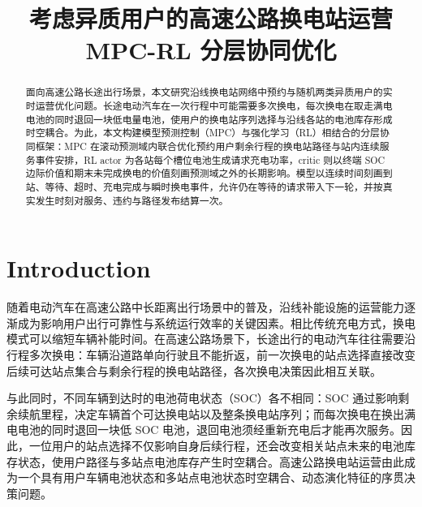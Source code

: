 \documentclass[12pt,a4paper,UTF8]{ctexart}
\begin{document}
\cover

\newpage
\begin{abstract}

面向高速公路长途出行场景，本文研究沿线换电站网络中预约与随机两类异质用户的实时运营优化问题。长途电动汽车在一次行程中可能需要多次换电，每次换电在取走满电电池的同时退回一块低电量电池，使用户的换电站序列选择与沿线各站的电池库存形成时空耦合。为此，本文构建模型预测控制（MPC）与强化学习（RL）相结合的分层协同框架：MPC 在滚动预测域内联合优化预约用户剩余行程的换电站路径与站内连续服务事件安排，RL actor 为各站每个槽位电池生成请求充电功率，critic 则以终端 SOC 边际价值和期末未完成换电的价值刻画预测域之外的长期影响。模型以连续时间刻画到站、等待、超时、充电完成与瞬时换电事件，允许仍在等待的请求带入下一轮，并按真实发生时刻对服务、违约与路径发布结算一次。

\end{abstract}
\newpage

\thispagestyle{empty} %

\newpage
\tableofcontents

\newpage

\begin{center}
   \title{ \Huge \textbf{{考虑异质用户的高速公路换电站运营 MPC-RL 分层协同优化}}}
\end{center}


\section{Introduction}
随着电动汽车在高速公路中长距离出行场景中的普及，沿线补能设施的运营能力逐渐成为影响用户出行可靠性与系统运行效率的关键因素。相比传统充电方式，换电模式可以缩短车辆补能时间。在高速公路场景下，长途出行的电动汽车往往需要沿行程多次换电：车辆沿道路单向行驶且不能折返，前一次换电的站点选择直接改变后续可达站点集合与剩余行程的换电站路径，各次换电决策因此相互关联。

与此同时，不同车辆到达时的电池荷电状态（SOC）各不相同：SOC 通过影响剩余续航里程，决定车辆首个可达换电站以及整条换电站序列；而每次换电在换出满电电池的同时退回一块低 SOC 电池，退回电池须经重新充电后才能再次服务。因此，一位用户的站点选择不仅影响自身后续行程，还会改变相关站点未来的电池库存状态，使用户路径与多站点电池库存产生时空耦合。高速公路换电站运营由此成为一个具有用户车辆电池状态和多站点电池状态时空耦合、动态演化特征的序贯决策问题。
\end{document}

